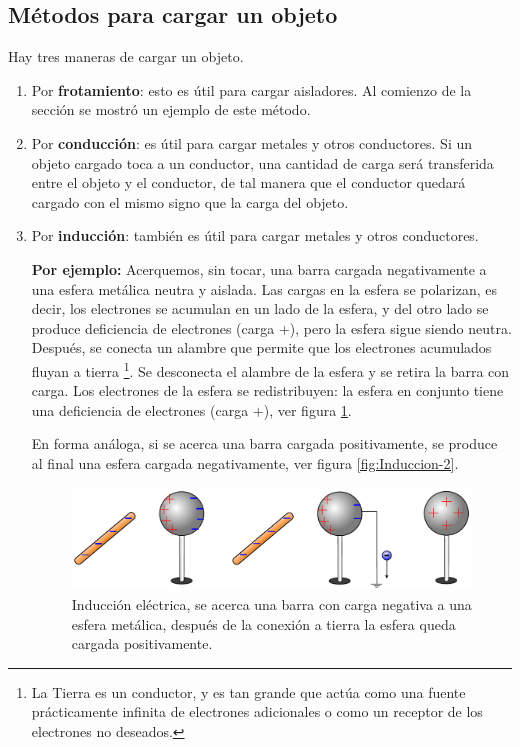 \subsection{Métodos para cargar un objeto}

Hay tres maneras de cargar un objeto. 

\begin{enumerate}
\item Por \textbf{frotamiento}: esto es útil para cargar aisladores. Al comienzo de la sección se mostró un ejemplo de este método.

\item Por \textbf{conducción}: es útil para cargar metales y otros conductores. Si un objeto cargado toca a un conductor, una cantidad de carga será transferida entre el objeto y el conductor, de tal manera que el conductor quedará cargado con el mismo signo que la carga del objeto.

\item Por \textbf{inducción}: también es útil para cargar metales y otros conductores. 

 \textbf{Por ejemplo:} Acerquemos, sin tocar, una barra cargada negativamente a una esfera metálica neutra y aislada. Las cargas en la esfera se polarizan, es decir, los electrones se acumulan en un lado de la esfera, y del otro lado se produce deficiencia de electrones (carga +), pero la esfera sigue siendo neutra. Después, se conecta un alambre que permite que los electrones acumulados fluyan a tierra \footnote{ La Tierra es un conductor, y es tan
grande que actúa como una fuente prácticamente infinita de electrones adicionales o como un receptor de los electrones no deseados.}. Se desconecta el alambre de la esfera y se retira la barra con carga. Los electrones de la esfera se redistribuyen: la esfera en conjunto tiene una deficiencia de electrones (carga $+$), ver figura \ref{fig:Induccion-1}. 

En forma análoga, si se acerca una barra
cargada positivamente, se produce al final una esfera cargada negativamente,  ver figura \ref{fig:Induccion-2}.

\begin{figure}[H]
    \centering
    \includegraphics[scale = 0.5]{Figuras/Induccion-1.pdf}
    \caption{Inducción eléctrica, se acerca una barra con carga negativa a una esfera metálica, después de la conexión a tierra la esfera queda cargada positivamente.}
    \label{fig:Induccion-1}
\end{figure}


\end{enumerate}
